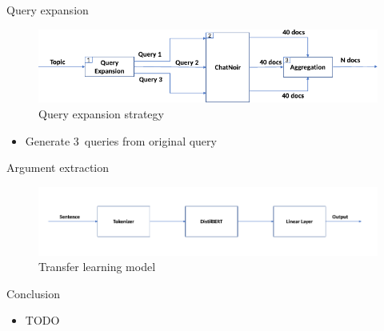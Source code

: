 \documentclass[english]{mlutalk}
\begin{document}
\begin{frame}[allowframebreaks]{Query expansion}
  \begin{figure}
    \centering
    \includegraphics[width=0.8\linewidth]{figures/distilbert-based-arg-retrieval-query-expansion.pdf}
    \caption{Query expansion strategy~\cite{AlhamzehBEM2021}}
    \label{query-expansion}
  \end{figure}

  \begin{itemize}
    \item Generate 3~queries from original query
  \end{itemize}
\end{frame}

\begin{frame}{Argument extraction~\cite{AlhamzehBEM2021}}
  \begin{figure}
    \centering
    \includegraphics[width=1\linewidth]{figures/distilbert-based-arg-retrieval-processing.pdf}
    \caption{Transfer learning model~\cite{AlhamzehBEM2021}}
    \label{processing}
  \end{figure}
\end{frame}

\begin{frame}{Conclusion}
  \begin{itemize}
    \item TODO
  \end{itemize}
  \thankyou
\end{frame}

\appendix
\section{\appendixname}

\bibliographyframe
\end{document}
